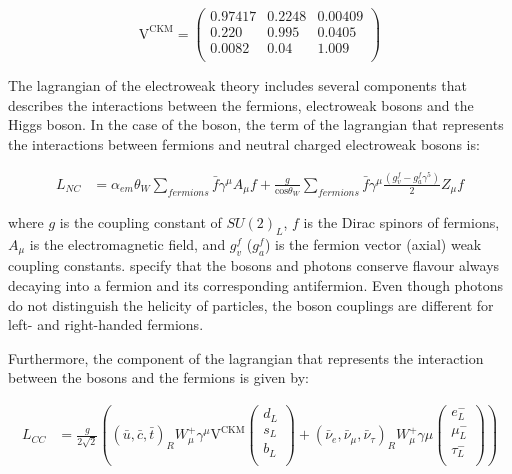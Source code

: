 \begin{equation}
\mathrm{V}^\mathrm{CKM} = \begin{pmatrix} 0.97417 & 0.2248 & 0.00409 \\ 0.220 & 0.995 & 0.0405 \\ 0.0082 & 0.04 & 1.009 \\ \end{pmatrix}
\end{equation}

The lagrangian of the electroweak theory includes several components that describes the interactions between the fermions, electroweak bosons and the Higgs boson. In the case of the {\PZ} boson, the term of the lagrangian that represents the interactions between fermions and neutral charged electroweak bosons is:

\begin{equation}
  \begin{split}
    L_{NC} &= {\alpha_{em}{\theta_{W}}}\sum_{fermions}\bar{f}\gamma^{\mu}A_{\mu}f + \frac{g}{\mathrm{cos}{\theta_{W}}}\sum_{fermions}\bar{f}\gamma^{\mu}\frac{\left(g^{f}_{v}-g^{f}_{a}\gamma^{5}\right)}{2}Z_{\mu}f
  \end{split}
  \label{eq:NeutralCurrent}
\end{equation}

where $g$ is the coupling constant of $SU(2)_{L}$, $f$ is the Dirac spinors of fermions, $A_{\mu}$ is the electromagnetic field, and $g^{f}_{v}$ ($g^{f}_{a}$) is the fermion vector (axial) weak coupling constants.  specify that the {\PZ} bosons and photons conserve flavour always decaying into a fermion and its corresponding antifermion. Even though photons do not distinguish the helicity of particles, the {\PZ} boson couplings are different for left- and right-handed fermions.

Furthermore, the component of the lagrangian that represents the interaction between the {\PW} bosons and the fermions is given by:

\begin{equation}
  \begin{split}
    L_{CC} &= \frac{g}{2\sqrt{2}}\left(\left(\bar{u}, \bar{c}, \bar{t}\right)_{R}W^{+}_{\mu}\gamma^{\mu}\mathrm{V}^{\mathrm{CKM}}\begin{pmatrix} d_{L} \\ s_{L} \\ b_{L} \\ \end{pmatrix} + \left(\bar{\nu}_{e}, \bar{\nu}_{\mu}, \bar{\nu}_{\tau}\right)_{R}W^{+}_{\mu}\gamma{\mu}\begin{pmatrix} e^{-}_{L} \\ \mu^{-}_{L} \\ \tau^{-}_{L} \\ \end{pmatrix}\right)
  \end{split}
\end{equation}


